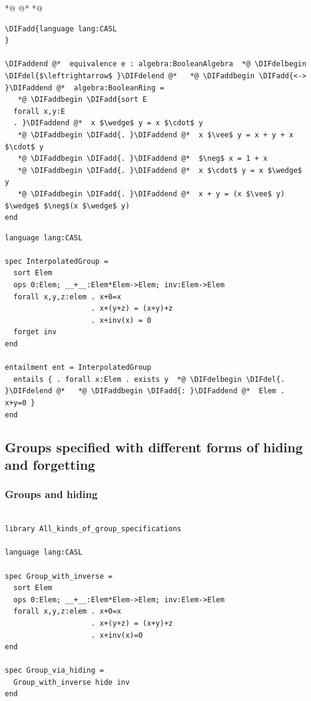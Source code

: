 \documentclass[10pt,fleqn,final]{scrreprt}
\newcommand{\ssclause}[1]{\subsection{#1}}
\newcommand{\sssclause}[1]{\subsubsection{#1}}
\providecommand{\DIFadd}[1]{{\protect\color{blue}\uwave{#1}}} %
\providecommand{\DIFdel}[1]{{\protect\color{red}\sout{#1}}}                      %
\providecommand{\DIFaddbegin}{} %
\providecommand{\DIFaddend}{} %
\providecommand{\DIFdelbegin}{} %
\providecommand{\DIFdelend}{} %
\begin{document}
 *@ \DIFdelbegin %
\DIFdelend @*   *@ \DIFaddbegin \begin{lstlisting}[basicstyle=\ttfamily,language=dolText,alsolanguage=clif,escapechar=@,mathescape]
\DIFadd{language lang:CASL
}

\DIFaddend @*  equivalence e : algebra:BooleanAlgebra  *@ \DIFdelbegin \DIFdel{$\leftrightarrow$ }\DIFdelend @*   *@ \DIFaddbegin \DIFadd{<-> }\DIFaddend @*  algebra:BooleanRing =
   *@ \DIFaddbegin \DIFadd{sort E
  forall x,y:E
  . }\DIFaddend @*  x $\wedge$ y = x $\cdot$ y
   *@ \DIFaddbegin \DIFadd{. }\DIFaddend @*  x $\vee$ y = x + y + x $\cdot$ y
   *@ \DIFaddbegin \DIFadd{. }\DIFaddend @*  $\neg$ x = 1 + x
   *@ \DIFaddbegin \DIFadd{. }\DIFaddend @*  x $\cdot$ y = x $\wedge$ y
   *@ \DIFaddbegin \DIFadd{. }\DIFaddend @*  x + y = (x $\vee$ y) $\wedge$ $\neg$(x $\wedge$ y)
end
\end{lstlisting}

\begin{lstlisting}[basicstyle=\ttfamily,language=dolText,alsolanguage=CASL,escapechar=@,mathescape]
language lang:CASL

spec InterpolatedGroup =
  sort Elem
  ops 0:Elem; __+__:Elem*Elem->Elem; inv:Elem->Elem
  forall x,y,z:elem . x+0=x
                    . x+(y+z) = (x+y)+z
                    . x+inv(x) = 0
  forget inv
end

entailment ent = InterpolatedGroup
  entails { . forall x:Elem . exists y  *@ \DIFdelbegin \DIFdel{. }\DIFdelend @*   *@ \DIFaddbegin \DIFadd{: }\DIFaddend @*  Elem . x+y=0 }
end
\end{lstlisting}

\ssclause{Groups specified with different forms of hiding and forgetting}

\sssclause{Groups and hiding}
\begin{lstlisting}[basicstyle=\ttfamily,language=dolText,alsolanguage=CASL,escapechar=@,mathescape]
%prefix( lang: <http://purl.net/DOL/languages/> )%

library All_kinds_of_group_specifications

language lang:CASL

spec Group_with_inverse =
  sort Elem
  ops 0:Elem; __+__:Elem*Elem->Elem; inv:Elem->Elem
  forall x,y,z:elem . x+0=x
                    . x+(y+z) = (x+y)+z
                    . x+inv(x)=0
end

spec Group_via_hiding =
  Group_with_inverse hide inv
end
\end{lstlisting}
\end{document}
